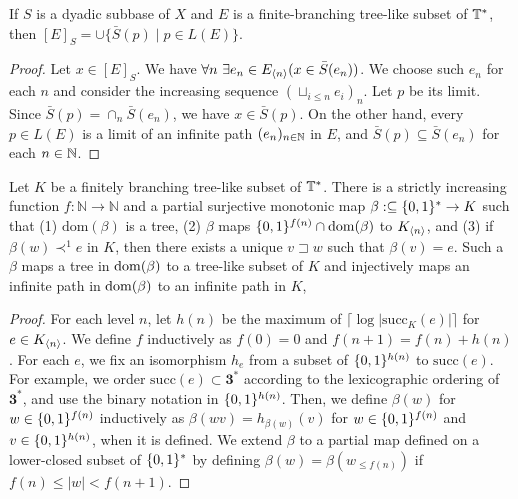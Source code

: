 \documentclass{eptcs-modified}
\begin{document}
  \begin{proposition}\label{prop:bracket}
If  $S$ is a dyadic subbase of $X$ and $E$ is a finite-branching tree-like subset of $\mathbb{T}^*$, then
  $[E]_S = \cup \{\bar{S}(p) \mid p \in L(E)\}$.
\end{proposition}
  \begin{proof}
   Let $x \in [E]_S$.  We have $\forall n\ \exists e_n \in {{E_{{\langle n\rangle}}}} (x \in \bar{S}(e_n))$.
  We choose such $e_n$ for each $n$ and consider the increasing sequence $(\sqcup_{i\leq n} e_i)_n$.
    Let $p$ be its limit.
    Since $\bar{S}(p) = \cap_n \bar{S}(e_n)$,
    we have $x \in \bar{S}(p)$.
    On the other hand, every $p \in L(E)$ is a limit of an infinite path $(e_n)_{n \in \mathbb{N}}$ in $E$,
    and $\bar{S}(p) \subseteq \bar{S}(e_n)$ for each $n \in \mathbb{N}$.
\end{proof}

  \begin{proposition}\label{prop:tree-like}
   Let $K$ be a finitely branching tree-like subset of $\mathbb{T}^*$.
   There is a strictly increasing function $f : \mathbb{N} \to \mathbb{N}$
and a partial surjective monotonic map $\beta :\subseteq  \{0,1\}^* \to K$ such that
(1) $\mathrm{dom}(\beta)$ is a tree,  (2) $\beta$ maps
$\{0,1\}^{f(n)} \cap \mathrm{dom}(\beta)$ to ${{K_{{\langle n\rangle}}}}$, and
(3) if $\beta(w) \prec^1 e$ in $K$, then
there exists a unique $v \sqsupset w$ such that $\beta(v) = e$.
Such a $\beta$ maps a tree in $\operatorname{dom}(\beta)$ to a tree-like subset of $K$
and injectively maps an infinite path in $\operatorname{dom}(\beta)$ to an infinite path in $K$,
 \end{proposition}
 \begin{proof}
 For each level $n$, let $h(n)$ be the maximum of $\lceil\log{|\mathrm{succ}_K(e)|}\rceil$ for $e \in {{K_{{\langle n\rangle}}}}$.
    We define $f$ inductively as $f(0) = 0$ and
    $f(n+1) = f(n) + h(n)$.
For each $e$,  we fix an isomorphism $h_e$ from a subset of
$\{0,1\}^{h(n)}$ to $\mathrm{succ}(e)$.
For example,  we order $\mathrm{succ}(e) \subset \mathbf{3}^*$
according to the lexicographic ordering of $\mathbf{3}^*$, and use the
binary notation in $\{0,1\}^{h(n)}$.
Then, we define
$\beta(w)$ for $w \in \{0,1\}^{f(n)}$ inductively as
$\beta(wv) = h_{\beta(w)}(v)$ for $w \in \{0,1\}^{f(n)}$ and $v \in \{0,1\}^{h(n)}$, when it is defined.  We extend $\beta$ to a partial map defined on a lower-closed subset of $\{0,1\}^*$
by defining $\beta(w) = \beta(w_{\leq f(n)})$ if $f(n) \leq |w| < f(n+1)$.
\end{proof}
\end{document}

